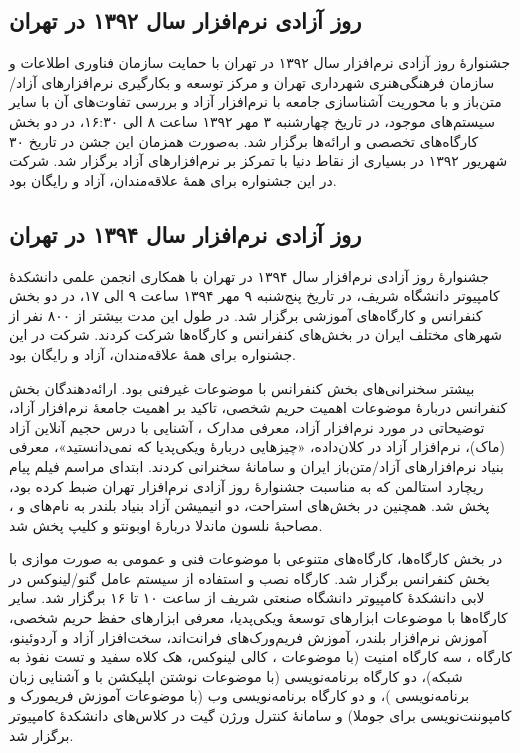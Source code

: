 \documentclass{article}
\begin{document}
\subsection{روز آزادی نرم‌افزار سال ۱۳۹۲ در تهران}
جشنوارهٔ روز آزادی نرم‌افزار سال ۱۳۹۲ در تهران با حمایت سازمان فناوری اطلاعات و سازمان فرهنگی‌هنری شهرداری تهران و مرکز توسعه و بکارگیری نرم‌افزارهای آزاد/متن‌باز و با محوریت آشناسازی جامعه با نرم‌افزار آزاد و بررسی تفاوت‌های آن با سایر سیستم‌های موجود، در تاریخ چهارشنبه ۳ مهر ۱۳۹۲ ساعت ۸ الی ۱۶:۳۰، در دو بخش کارگاه‌های تخصصی و ارائه‌ها برگزار شد. به‌صورت همزمان این جشن در تاریخ ۳۰ شهریور ۱۳۹۲  در بسیاری از نقاط دنیا با تمرکز بر نرم‌افزارهای آزاد برگزار شد. شرکت در این جشنواره برای همهٔ علاقه‌مندان، آزاد و رایگان بود.

\subsection{روز آزادی نرم‌افزار سال ۱۳۹۴ در تهران}
جشنوارهٔ روز آزادی نرم‌افزار سال ۱۳۹۴ در تهران با همکاری انجمن علمی دانشکدهٔ کامپیوتر دانشگاه شریف، در تاریخ پنج‌شنبه ۹ مهر ۱۳۹۴ ساعت ۹ الی ۱۷، در دو بخش کنفرانس و کارگاه‌های آموزشی برگزار شد. در طول این مدت بیشتر از ۸۰۰ نفر از شهرهای مختلف ایران در بخش‌های کنفرانس و کارگاه‌ها شرکت کردند. شرکت در این جشنواره برای همهٔ علاقه‌مندان، آزاد و رایگان بود.

بیشتر سخنرانی‌های بخش کنفرانس با موضوعات غیرفنی بود. ارائه‌دهندگان بخش کنفرانس دربارهٔ موضوعات اهمیت حریم شخصی، تاکید بر اهمیت جامعهٔ نرم‌افزار آزاد، توضیحاتی در مورد نرم‌افزار آزاد، معرفی مدارک ، آشنایی با درس حجیم آنلاین آزاد (ماک)، نرم‌افزار آزاد در کلان‌داده، «چیزهایی دربارهٔ ویکی‌پدیا که نمی‌دانستید»، معرفی بنیاد نرم‌افزارهای آزاد/متن‌باز ایران و سامانهٔ  سخنرانی کردند. ابتدای مراسم فیلم پیام ریچارد استالمن که به مناسبت جشنوارهٔ روز آزادی نرم‌افزار تهران ضبط کرده بود، پخش شد. همچنین در بخش‌‌های استراحت، دو انیمیشن آزاد بنیاد بلندر به نام‌های  و ، مصاحبهٔ نلسون ماندلا دربارهٔ اوبونتو و کلیپ  پخش شد.

در بخش کارگاه‌ها، کارگاه‌های متنوعی با موضوعات فنی و عمومی به صورت موازی با بخش کنفرانس برگزار شد. کارگاه نصب و استفاده از سیستم عامل گنو/لینوکس در لابی دانشکدهٔ کامپیوتر دانشگاه صنعتی شریف از ساعت ۱۰ تا ۱۶ برگزار شد. سایر کارگاه‌ها با موضوعات ابزارهای توسعهٔ ویکی‌پدیا، معرفی ابزارهای حفظ حریم شخصی، آموزش نرم‌افزار بلندر، آموزش فریم‌ورک‌های فرانت‌اند، سخت‌افزار آزاد و آردوئینو،  کارگاه ، سه کارگاه امنیت (با موضوعات ، کالی لینوکس، هک کلاه سفید و تست نفوذ به شبکه)،  دو کارگاه برنامه‌نویسی (با موضوعات نوشتن اپلیکشن با  و آشنایی زبان برنامه‌نویسی )، و دو کارگاه برنامه‌نویسی وب (با موضوعات آموزش فریمورک  و کامپوننت‌نویسی برای جوملا) و سامانهٔ کنترل ورژن گیت در کلاس‌های دانشکدهٔ کامپیوتر برگزار شد.
\end{document}
